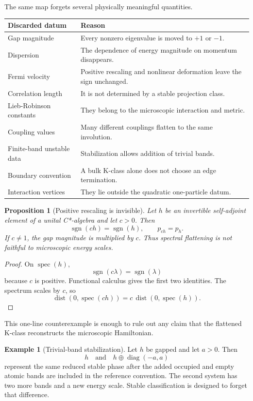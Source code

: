 \documentclass[12pt]{article}
\newtheorem{proposition}[theorem]{Proposition}
\theoremstyle{definition}
\newtheorem{example}[theorem]{Example}
\theoremstyle{remark}
\newcommand{\spec}{\operatorname{spec}}
\newcommand{\sgn}{\operatorname{sgn}}
\newcommand{\dist}{\operatorname{dist}}
\newcommand{\diag}{\operatorname{diag}}
\begin{document}
The same map forgets several physically meaningful quantities.

\begin{center}
\begin{tabular}{p{}p{}}
\toprule
Discarded datum & Reason \\
\midrule
Gap magnitude & Every nonzero eigenvalue is moved to $+1$ or $-1$.\\
Dispersion & The dependence of energy magnitude on momentum disappears.\\
Fermi velocity & Positive rescaling and nonlinear deformation leave the sign unchanged.\\
Correlation length & It is not determined by a stable projection class.\\
Lieb-Robinson constants & They belong to the microscopic interaction and metric.\\
Coupling values & Many different couplings flatten to the same involution.\\
Finite-band unstable data & Stabilization allows addition of trivial bands.\\
Boundary convention & A bulk K-class alone does not choose an edge termination.\\
Interaction vertices & They lie outside the quadratic one-particle datum.\\
\bottomrule
\end{tabular}
\end{center}

\begin{proposition}[Positive rescaling is invisible]
\label{prop:rescaling}
Let $h$ be an invertible self-adjoint element of a unital C*-algebra and let
$c>0$.
Then
\[
\sgn(ch)=\sgn(h),
\qquad
p_{ch}=p_h.
\]
If $c\neq1$, the gap magnitude is multiplied by $c$.
Thus spectral flattening is not faithful to microscopic energy scales.
\end{proposition}

\begin{proof}
On $\spec(h)$,
\[
\sgn(c\lambda)=\sgn(\lambda)
\]
because $c$ is positive.
Functional calculus gives the first two identities.
The spectrum scales by $c$, so
\[
\dist(0,\spec(ch))
=
c\,\dist(0,\spec(h)).
\]
\end{proof}

This one-line counterexample is enough to rule out any claim that the
flattened K-class reconstructs the microscopic Hamiltonian.

\begin{example}[Trivial-band stabilization]
Let $h$ be gapped and let $a>0$.
Then
\[
h
\quad\text{and}\quad
h\oplus\diag(-a,a)
\]
represent the same reduced stable phase after the added occupied and empty
atomic bands are included in the reference convention.
The second system has two more bands and a new energy scale.
Stable classification is designed to forget that difference.
\end{example}
\end{document}

